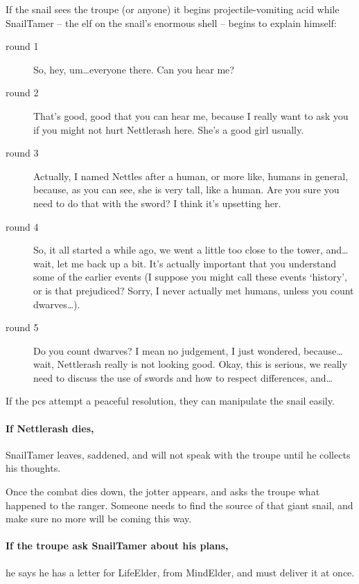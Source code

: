 If the snail sees the troupe (or anyone) it begins projectile-vomiting acid while \gls{SnailTamer} -- the elf on the snail's enormous shell -- begins to explain himself:

\begin{description}
  \item[round 1] So, hey, um\ldots everyone there.
  Can you hear me?

  \item[round 2] That's good, good that you can hear me, because I really want to ask you if you might not hurt Nettlerash here.  She's a good girl usually.

  \item[round 3] Actually, I named Nettles after a human, or more like, humans in general, because, as you can see, she is very tall, like a human.  Are you sure you need to do that with the sword?  I think it's upsetting her.

  \item[round 4] So, it all started a while ago, we went a little too close to the tower, and\ldots wait, let me back up a bit.  It's actually important that you understand some of the earlier events (I suppose you might call these events `history', or is that prejudiced?  Sorry, I never actually met humans, unless you count dwarves\ldots).

  \item[round 5] Do you count dwarves?
  I mean no judgement, I just wondered, because\ldots wait, Nettlerash really is not looking good.  Okay, this is serious, we really need to discuss the use of swords and how to respect differences, and\ldots
\end{description}

If the \glspl{pc} attempt a peaceful resolution,
they can manipulate the snail easily.

\paragraph{If Nettlerash dies,}
\gls{SnailTamer} leaves, saddened, and will not speak with the troupe until he collects his thoughts.

Once the combat dies down,
the \gls{jotter} appears, and asks the troupe what happened to the ranger.
Someone needs to find the source of that giant snail, and make sure no more will be coming this way.

\paragraph{If the troupe ask \gls{SnailTamer} about his plans,}
he says he has a letter for \gls{LifeElder}, from \gls{MindElder}, and must deliver it at once.

